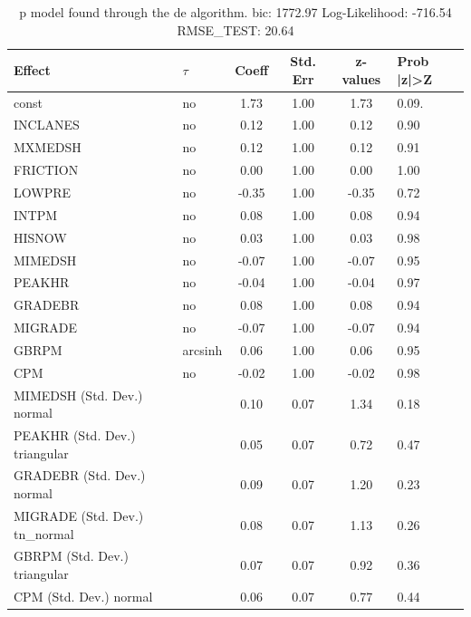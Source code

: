 \begin{table}
	\caption{p model found through the de algorithm. bic: 1772.97 Log-Likelihood: -716.54 RMSE_TEST: 20.64}
	\begin{center}
		\begin{tabular}{|l|l|c|c|c|l|}
			\hline
			Effect & $\tau$ & Coeff & Std. Err & z-values & Prob |z|>Z \\
			\hline
			const & no & 1.73 & 1.00 & 1.73 & 0.09. \\
			\hline
			INCLANES & no & 0.12 & 1.00 & 0.12 & 0.90 \\
			\hline
			MXMEDSH & no & 0.12 & 1.00 & 0.12 & 0.91 \\
			\hline
			FRICTION & no & 0.00 & 1.00 & 0.00 & 1.00 \\
			\hline
			LOWPRE & no & -0.35 & 1.00 & -0.35 & 0.72 \\
			\hline
			INTPM & no & 0.08 & 1.00 & 0.08 & 0.94 \\
			\hline
			HISNOW & no & 0.03 & 1.00 & 0.03 & 0.98 \\
			\hline
			MIMEDSH & no & -0.07 & 1.00 & -0.07 & 0.95 \\
			\hline
			PEAKHR & no & -0.04 & 1.00 & -0.04 & 0.97 \\
			\hline
			GRADEBR & no & 0.08 & 1.00 & 0.08 & 0.94 \\
			\hline
			MIGRADE & no & -0.07 & 1.00 & -0.07 & 0.94 \\
			\hline
			GBRPM & arcsinh & 0.06 & 1.00 & 0.06 & 0.95 \\
			\hline
			CPM & no & -0.02 & 1.00 & -0.02 & 0.98 \\
			\hline
			MIMEDSH (Std. Dev.) normal &  & 0.10 & 0.07 & 1.34 & 0.18 \\
			\hline
			PEAKHR (Std. Dev.) triangular &  & 0.05 & 0.07 & 0.72 & 0.47 \\
			\hline
			GRADEBR (Std. Dev.) normal &  & 0.09 & 0.07 & 1.20 & 0.23 \\
			\hline
			MIGRADE (Std. Dev.) tn_normal &  & 0.08 & 0.07 & 1.13 & 0.26 \\
			\hline
			GBRPM (Std. Dev.) triangular &  & 0.07 & 0.07 & 0.92 & 0.36 \\
			\hline
			CPM (Std. Dev.) normal &  & 0.06 & 0.07 & 0.77 & 0.44 \\
			\hline
		\end{tabular}
	\end{center}
\end{table}